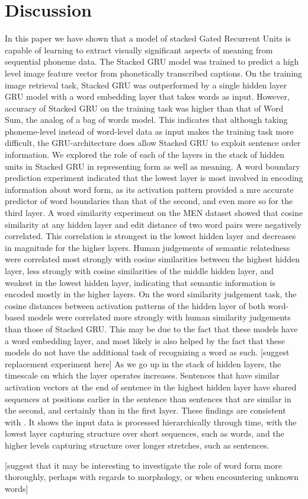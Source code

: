 \section{Discussion}
\label{sec:discussion}
In this paper we have shown that a model of stacked Gated Recurrent Units is capable of learning to extract visually significant aspects of meaning from sequential phoneme data. The {\sc Stacked GRU} model was trained to predict a high level image feature vector from phonetically transcribed captions. On the training image retrieval task, {\sc Stacked GRU} was outperformed by a single hidden layer GRU model with a word embedding layer that takes words as input. However, accuracy of {\sc Stacked GRU} on the training task was higher than that of {\sc Word Sum}, the analog of a bag of words model. This indicates that although taking phoneme-level instead of word-level data as input makes the training task more difficult, the GRU-architecture does allow {\sc Stacked GRU} to exploit sentence order information.
We explored the role of each of the layers in the stack of hidden units in {\sc Stacked GRU} in representing form as well as meaning. A word boundary prediction experiment indicated that the lowest layer is most involved in encoding information about word form, as its activation pattern provided a mre accurate predictor of word boundaries than that of the second, and even more so for the third layer. A word similarity experiment on the MEN dataset showed that cosine similarity at any hidden layer and edit distance of two word pairs were negatively correlated. This correlation is strongest in the lowest hidden layer and decreases in magnitude for the higher layers. 
Human judgements of semantic relatedness were correlated most strongly with cosine similarities between the highest hidden layer, less strongly with cosine similarities of the middle hidden layer, and weakest in the lowest hidden layer, indicating that semantic information is encoded mostly in the higher layers. On the word similarity judgement task, the cosine distances between activation patterns of the hidden layer of both word-based models were correlated more strongly with human similarity judgements than those of {\sc Stacked GRU}. This may be due to the fact that these models have a word embedding layer, and most likely is also helped by the fact that these models do not have the additional task of recognizing a word as such. [suggest replacement experiment here]
As we go up in the stack of hidden layers, the timescale on which the layer operates increases. Sentences that have similar activation vectors at the end of sentence in the highest hidden layer have shared sequences at positions earlier in the sentence than sentences that are similar in the second, and certainly than in the first layer. These findings are consistent with . It shows the input data is processed hierarchically through time, with the lowest layer capturing structure over short sequences, such as words, and the higher levels capturing structure over longer stretches, such as sentences. 

[suggest that it may be interesting to investigate the role of word form more thoroughly, perhaps with regards to morphology, or when encountering unknown words]